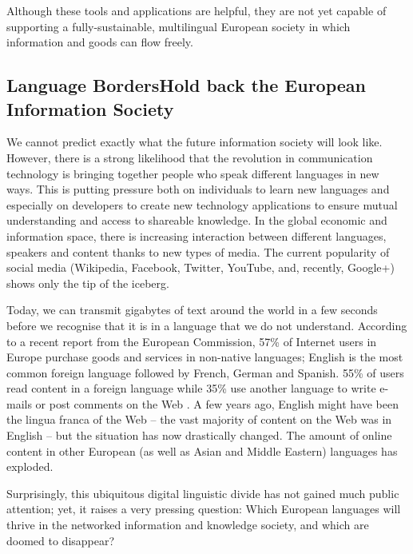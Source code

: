 \begin{multicols}{2}
Although these tools and applications are helpful, they are not yet capable of supporting a fully-sustainable, multilingual European society in which information and goods can flow freely.

\subsection[Language Borders Hold back the European Information Society]{Language Borders\newline Hold back the European Information Society}

We cannot predict exactly what the future information society will look like. However, there is a strong likelihood that the revolution in communication technology is bringing together people who speak different languages in new ways. This is putting pressure both on individuals to learn new languages and especially on developers to create new technology applications to ensure mutual understanding and access to shareable knowledge. In the global economic and information space, there is increasing interaction between different languages, speakers and content thanks to new types of media. The current popularity of social media (Wikipedia, Facebook, Twitter, YouTube, and, recently, Google+) shows only the tip of the iceberg.


Today, we can transmit gigabytes of text around the world in a few
seconds before we recognise that it is in a language that we do not
understand. According to a recent report from the European Commission,
57\% of Internet users in Europe purchase goods and services in
non-native languages; English is the most common foreign language
followed by French, German and Spanish. 55\% of users read content in
a foreign language while 35\% use another language to write e-mails or
post comments on the Web \cite{EC1}. A few years ago, English might
have been the lingua franca of the Web -- the vast majority of content
on the Web was in English -- but the situation has now drastically
changed. The amount of online content in other European (as well as
Asian and Middle Eastern) languages has exploded.

Surprisingly, this ubiquitous digital linguistic divide has not gained much public attention; yet, it raises a very pressing question: Which European languages will thrive in the networked information and knowledge society, and which are doomed to disappear?


\end{multicols}
